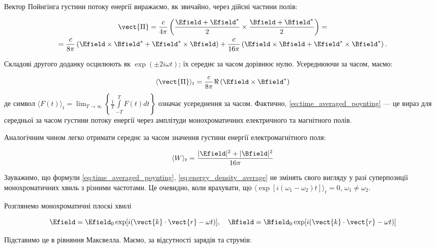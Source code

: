 Вектор Пойнгінга густини потоку енергії виражаємо, як звичайно, через дійсні частини полів:

\begin{multline*}
\vect{\Pi} = \frac{c}{4\pi} \left( \frac{\Efield + \Efield^{*}}{2} \times \frac{\Bfield + \Bfield^{*}}{2} \right) = \\
= \frac{c}{8\pi} \left( \Efield \times \Bfield^{*} + \Efield^{*} \times \Bfield \right) + \frac{c}{16\pi} \left( \Efield \times \Bfield +
\Efield^{*} \times \Bfield^{*} \right).
\end{multline*}

Складові другого доданку осцилюють як \(\exp(\pm 2i\omega t)\); їх середнє за часом дорівнює нулю. Усереднюючи за часом, маємо:

\begin{equation}
\langle \vect{\Pi} \rangle_t = \frac{c}{8\pi} \Re\left(\Efield \times \Bfield^{*}\right)
\label{eq:time_averaged_poynting}
\end{equation}
де символ \(\langle F(t) \rangle_t = \lim_{T \to \infty} \left\{ \frac{1}{T} \int\limits_{-T}^{T} F(t) dt \right\}\) означає усереднення за часом.
Фактично,
\eqref{eq:time_averaged_poynting} --- це вираз для середньої за часом густини потоку енергії через амплітуди монохроматичних електричного та магнітного
полів.

Аналогічним чином легко отримати середнє за часом значення густини енергії електромагнітного поля:

\begin{equation}
\langle W \rangle_t = \frac{\lvert \Efield \rvert^2 + \lvert \Bfield \rvert^2}{16\pi}
\label{eq:energy_density_average}
\end{equation}

Зауважимо, що формули \eqref{eq:time_averaged_poynting}, \eqref{eq:energy_density_average} не змінять свого вигляду у разі суперпозиції монохроматичних
хвиль з різними частотами. Це очевидно, коли врахувати, що \(\langle \exp[i(\omega_1 - \omega_2)t] \rangle_t = 0\), \(\omega_1 \neq \omega_2\).

Розглянемо монохроматичні плоскі хвилі

\begin{equation*}
\Efield = \Efield_0 \exp[i(\vect{k} \cdot \vect{r} - \omega t)], \quad \Bfield = \Bfield_0 \exp[i(\vect{k} \cdot \vect{r} - \omega t)]
\label{eq:monochromatic_waves}
\end{equation*}

Підставимо це в рівняння Максвелла. Маємо, за відсутності зарядів та струмів:


